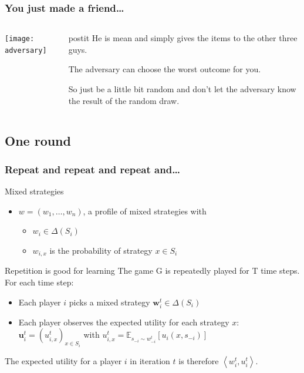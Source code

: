 \documentclass{beamer}
\begin{document}
\begin{frame}
	\frametitle{You just made a friend\ldots}
	\begin{columns}[T]
		\begin{column}{.5\textwidth}
			\texttt{[image: adversary]} \pause
		\end{column}
		\begin{column}{.5\textwidth}
			\begin{beamercolorbox}[sep=1em]{postit}
				He is mean and simply gives the items to the other three guys.
			\end{beamercolorbox}\pause
			The adversary can choose the worst outcome for you.
			
			\vspace{1em}
			\pause
			So just be a little bit random and don't let the adversary know the result of the random draw.
		\end{column}
	\end{columns}
	
\end{frame}

\subsection{One round}

\begin{frame}
	\frametitle{Repeat and repeat and repeat and\ldots}
	\begin{block}{Mixed strategies}
	\begin{itemize}
		
		\item $ w = (w_1 , \ldots, w_n)$, a profile of mixed strategies with
		\begin{itemize}
			\item $w_i \in \Delta(S_i)$
			\item $w_{i,x}$ is the probability of strategy $x \in S_i$
		\end{itemize}
		
	\end{itemize}
	\end{block}
	\pause
	\begin{block}{Repetition is good for learning}
		The game G is repeatedly played for T time steps.\\
		For each time step:
		\begin{itemize}
			\item Each player $i$ picks a mixed strategy $\mathbf{w}^t_i \in \Delta(S_i)$ 
			\item Each player observes the expected utility for each strategy $x$: $\mathbf{u}^t_i = (u^t_{i,x})_{x \in S_i} $ with $ u^t_{i,x} = \mathbb{E}_{s_{-i} \sim w^t_{-i}} \left[u_i(x,s_{-i})\right] $
		\end{itemize}
		
		The expected utility for a player $i$ in iteration $t$ is therefore 
		$ \left\langle w^t_{i},u^t_{i}\right\rangle $.
	\end{block}
\end{frame}
\end{document}
